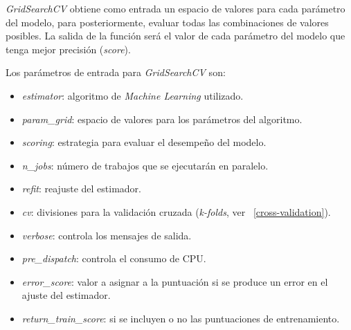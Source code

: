 \documentclass[12pt,a4paper]{article}
\begin{document}
\textit{GridSearchCV} obtiene como entrada un espacio de valores para cada parámetro del modelo, para posteriormente, evaluar todas las combinaciones de valores posibles. La salida de la función será el valor de cada parámetro del modelo que tenga mejor precisión (\textit{score}).


Los parámetros de entrada para \textit{GridSearchCV} son:
\begin{itemize}
	\item \textit{estimator}: algoritmo de \textit{Machine Learning} utilizado.
	\item \textit{param\_grid}: espacio de valores para los parámetros del algoritmo.
	\item \textit{scoring}: estrategia para evaluar el desempeño del modelo.
	\item \textit{n\_jobs}: número de trabajos que se ejecutarán en paralelo.
	\item \textit{refit}: reajuste del estimador.
	\item \textit{cv}: divisiones para la validación cruzada (\textit{k-folds}, ver ~\ref{cross-validation}).
	\item \textit{verbose}: controla los mensajes de salida.
	\item \textit{pre\_dispatch}: controla el consumo de CPU.
	\item \textit{error\_score}: valor a asignar a la puntuación si se produce un error en el ajuste del estimador.
	\item \textit{return\_train\_score}: si se incluyen o no las puntuaciones de entrenamiento.
\end{itemize}
\end{document}
